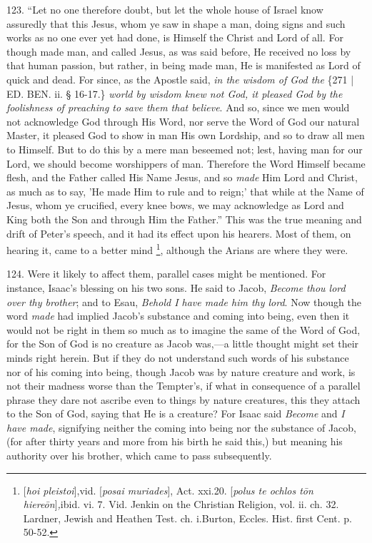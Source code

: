 123. ``Let no one therefore
doubt, but let the whole house of Israel know assuredly that this
Jesus, whom ye saw in shape a man, doing signs and such works as no
one ever yet had done, is Himself the Christ and Lord of all. For
though made man, and called Jesus, as was said before, He received no
loss by that human passion, but rather, in being made man, He is
manifested as Lord of quick and dead. For since, as the Apostle said, \emph{in
the wisdom of God the} \{271 | ED.
BEN.
ii. § 16-17.\} \emph{world by wisdom knew not God, it pleased God by the
foolishness of preaching to save them that believe}. And so, since
we men would not acknowledge God through His Word, nor serve the Word
of God our natural Master, it pleased God to show in man His own
Lordship, and so to draw all men to Himself. But to do this by a mere
man beseemed not; lest, having man for our Lord, we should become
worshippers of man. Therefore the Word Himself became flesh, and the
Father called His Name Jesus, and so \emph{made} Him Lord and Christ,
as much as to say, 'He made Him to rule and to reign;' that while at
the Name of Jesus, whom ye crucified, every knee bows, we may
acknowledge as Lord and King both the Son and through Him the Father.''
This was the true meaning and drift of Peter's speech, and it had its
effect upon his hearers. Most of them, on hearing it, came to a better
mind \footnote{[\emph{hoi pleistoi}],\emph{}vid. [\emph{posai muriades}], Act.
xxi.\emph{}20. [\emph{polus te ochlos t\={o}n hiere\={o}n}]\emph{,}ibid. vi. 7. Vid. Jenkin on the Christian Religion, vol. ii. ch.
32. Lardner, Jewish and Heathen Test. ch. i.\emph{}Burton, Eccles.
Hist. first Cent. p. 50-52.}, although the Arians
are where they were.

124. Were it likely to affect
them, parallel cases might be mentioned. For instance, Isaac's
blessing on his two sons. He said to Jacob, \emph{Become thou lord over
thy brother}; and to Esau, \emph{Behold I have made him thy lord}.
Now though the word \emph{made} had implied Jacob's substance and
coming into being, even then it would not be right in them so much as
to imagine the same of the Word of God, for the Son of God is no
creature as Jacob was,—a little thought might set their minds right
herein. But if they do not understand such words of his substance nor
of his coming into being, though Jacob was by nature creature and
work, is not their madness worse than the Tempter's, if what in
consequence of a parallel phrase they dare not ascribe even to things
by nature creatures, this they attach to the Son of God, saying
that He is a creature? For Isaac said \emph{Become} and \emph{I have made},
signifying neither the coming into being nor the substance of Jacob,
(for after thirty years and more from his birth he said this,) but
meaning his authority over his brother, which came to pass
subsequently.

